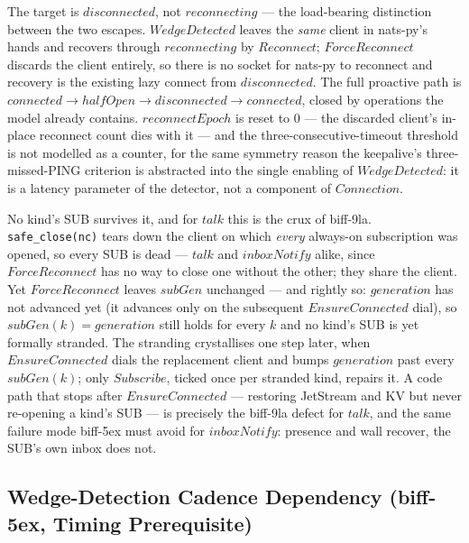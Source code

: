 \documentclass[a4paper,10pt,fleqn]{article}
\begin{document}
The target is $disconnected$, not $reconnecting$ --- the load-bearing
distinction between the two escapes.  $WedgeDetected$ leaves the
\emph{same} client in nats-py's hands and recovers through
$reconnecting$ by $Reconnect$; $ForceReconnect$ discards the client
entirely, so there is no socket for nats-py to reconnect and recovery is
the existing lazy connect from $disconnected$.  The full proactive path
is $connected \to halfOpen \to disconnected \to connected$, closed by
operations the model already contains.  $reconnectEpoch$ is reset to $0$
--- the discarded client's in-place reconnect count dies with it --- and
the three-consecutive-timeout threshold is not modelled as a counter,
for the same symmetry reason the keepalive's three-missed-PING criterion
is abstracted into the single enabling of $WedgeDetected$: it is a
latency parameter of the detector, not a component of $Connection$.

No kind's SUB survives it, and for $talk$ this is the crux of biff-9la.
\texttt{safe\_close(nc)} tears down the client on which \emph{every}
always-on subscription was opened, so every SUB is dead --- $talk$ and
$inboxNotify$ alike, since $ForceReconnect$ has no way to close one
without the other; they share the client.  Yet $ForceReconnect$ leaves
$subGen$ unchanged --- and rightly so: $generation$ has not advanced yet
(it advances only on the subsequent $EnsureConnected$ dial), so
$subGen(k) = generation$ still holds for every $k$ and no kind's SUB is
yet formally stranded.  The stranding crystallises one step later, when
$EnsureConnected$ dials the replacement client and bumps $generation$ past
every $subGen(k)$; only $Subscribe$, ticked once per stranded kind,
repairs it.  A code path that stops after $EnsureConnected$ --- restoring
JetStream and KV but never re-opening a kind's SUB --- is precisely the
biff-9la defect for $talk$, and the same failure mode biff-5ex must avoid
for $inboxNotify$: presence and wall recover, the SUB's own inbox does
not.

\subsection{Wedge-Detection Cadence Dependency (biff-5ex, Timing
Prerequisite)}
\label{sec:cadence}
\end{document}
